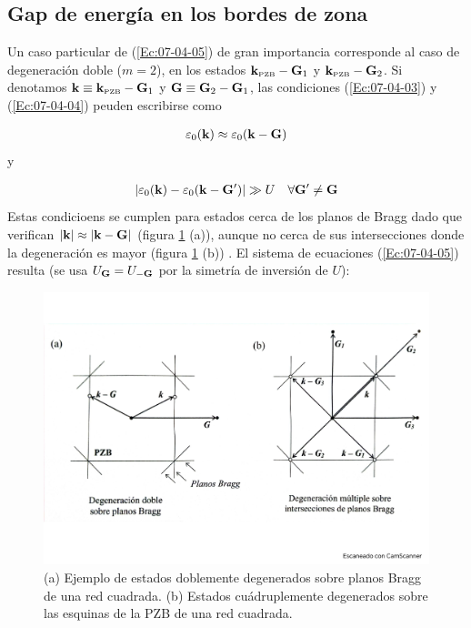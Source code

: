 \subsection{Gap de energía en los bordes de zona}

Un caso particular de (\ref{Ec:07-04-05}) de gran importancia corresponde al caso de degeneración doble ($m=2$), en los estados $\mathbf{k}_{\text{{\tiny PZB}}} - \mathbf{G}_1$ y $\mathbf{k}_{\text{{\tiny PZB}}} - \mathbf{G}_2$. Si denotamos $\mathbf{k} \equiv \mathbf{k}_{\text{{\tiny PZB}}} - \mathbf{G}_1$ y $\mathbf{G} \equiv \mathbf{G}_2 - \mathbf{G}_1$, las condiciones (\ref{Ec:07-04-03}) y (\ref{Ec:07-04-04}) peuden escribirse como

\begin{eqnarray}
    \varepsilon_0 (\mathbf{k}) \approx \varepsilon_0 (\mathbf{k} - \mathbf{G})
\end{eqnarray}
y 

\begin{eqnarray}
    |\varepsilon_0 (\mathbf{k}) - \varepsilon_0 (\mathbf{k} - \mathbf{G}')|\gg U \quad \forall \mathbf{G}'\neq \mathbf{G}
\end{eqnarray}
Estas condicioens se cumplen para estados cerca de los planos de Bragg dado que verifican $|\mathbf{k}|\approx |\mathbf{k}-\mathbf{G}|$ (figura \ref{Fig:07-02} (a)), aunque no cerca de sus intersecciones donde la degeneración es mayor (figura \ref{Fig:07-02} (b)) . El sistema de ecuaciones (\ref{Ec:07-04-05}) resulta (se usa $U_{\mathbf{G}}=U_{-\mathbf{G}}$ por la simetría de inversión de $U$):



\begin{figure}[h!] \centering
    \includegraphics[scale=0.35]{Cuerpo/Ch_07/Fotos libro 2.pdf}
    \caption{(a) Ejemplo de estados doblemente degenerados sobre planos Bragg de una red cuadrada. (b) Estados cuádruplemente degenerados sobre las esquinas de la PZB de una red cuadrada.}
    \label{Fig:07-02}
\end{figure}    

